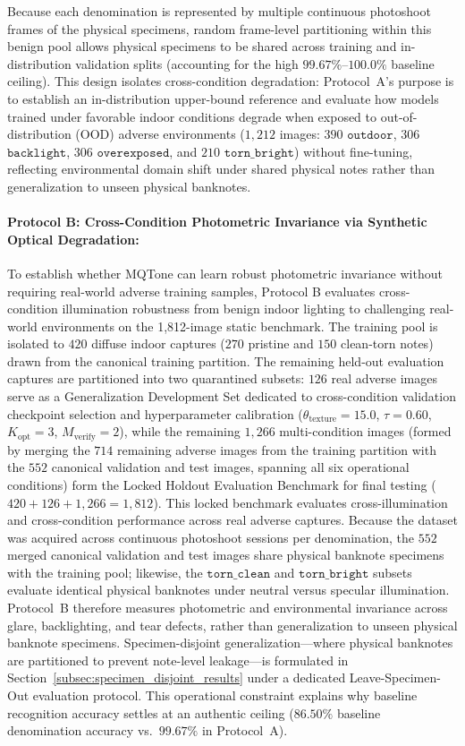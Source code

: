 \documentclass[final,5p,times,twocolumn,authoryear]{elsarticle}
\begin{document}
Because each denomination is represented by multiple continuous photoshoot frames of the physical specimens, random frame-level partitioning within this benign pool allows physical specimens to be shared across training and in-distribution validation splits (accounting for the high $99.67\%$--$100.0\%$ baseline ceiling). This design isolates cross-condition degradation: Protocol~A's purpose is to establish an in-distribution upper-bound reference and evaluate how models trained under favorable indoor conditions degrade when exposed to out-of-distribution (OOD) adverse environments ($1{,}212$ images: $390$ $\texttt{outdoor}$, $306$ $\texttt{backlight}$, $306$ $\texttt{overexposed}$, and $210$ $\texttt{torn\_bright}$) without fine-tuning, reflecting environmental domain shift under shared physical notes rather than generalization to unseen physical banknotes.

\paragraph{Protocol B: Cross-Condition Photometric Invariance via Synthetic Optical Degradation:}
To establish whether MQTone can learn robust photometric invariance without requiring real-world adverse training samples, Protocol B evaluates cross-condition illumination robustness from benign indoor lighting to challenging real-world environments on the 1,812-image static benchmark. The training pool is isolated to $420$ diffuse indoor captures ($270$ pristine and $150$ clean-torn notes) drawn from the canonical training partition. The remaining held-out evaluation captures are partitioned into two quarantined subsets: $126$ real adverse images serve as a Generalization Development Set dedicated to cross-condition validation checkpoint selection and hyperparameter calibration ($\theta_{\text{texture}} = 15.0$, $\tau = 0.60$, $K_{\text{opt}} = 3$, $M_{\text{verify}} = 2$), while the remaining $1{,}266$ multi-condition images (formed by merging the $714$ remaining adverse images from the training partition with the $552$ canonical validation and test images, spanning all six operational conditions) form the Locked Holdout Evaluation Benchmark for final testing ($420 + 126 + 1{,}266 = 1{,}812$). This locked benchmark evaluates cross-illumination and cross-condition performance across real adverse captures. Because the dataset was acquired across continuous photoshoot sessions per denomination, the $552$ merged canonical validation and test images share physical banknote specimens with the training pool; likewise, the $\texttt{torn\_clean}$ and $\texttt{torn\_bright}$ subsets evaluate identical physical banknotes under neutral versus specular illumination. Protocol~B therefore measures photometric and environmental invariance across glare, backlighting, and tear defects, rather than generalization to unseen physical banknote specimens. Specimen-disjoint generalization---where physical banknotes are partitioned to prevent note-level leakage---is formulated in Section~\ref{subsec:specimen_disjoint_results} under a dedicated Leave-Specimen-Out evaluation protocol. This operational constraint explains why baseline recognition accuracy settles at an authentic ceiling ($86.50\%$ baseline denomination accuracy vs.\ $99.67\%$ in Protocol~A).
\end{document}
